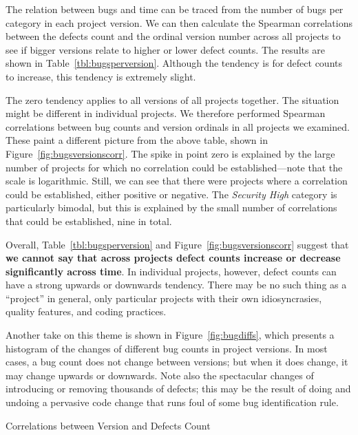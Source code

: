 \documentclass[letterpaper,twocolumn,10pt]{article}
\begin{document}
The relation between bugs and time can be traced from the number of
bugs per category in each project version. We can then calculate the
Spearman correlations between the defects count and the ordinal
version number across all projects to see if bigger versions relate to
higher or lower defect counts. The results are shown in
Table~\ref{tbl:bugsperversion}. Although the tendency is for defect
counts to increase, this tendency is extremely slight.

The zero tendency applies to all versions of all projects together. 
The situation might be different in individual projects. We therefore
performed Spearman correlations between bug counts and version
ordinals in all projects we examined. These paint a different picture
from the above table, shown in Figure~\ref{fig:bugsversionscorr}. The
spike in point zero is explained by the large number of projects for
which no correlation could be established---note that the scale is
logarithmic. Still, we can see that there were projects where a
correlation could be established, either positive or negative. The
{\it Security High} category is particularly bimodal, but this is
explained by the small number of correlations that could be
established, nine in total.

Overall, Table~\ref{tbl:bugsperversion} and
Figure~\ref{fig:bugsversionscorr} suggest that \textbf{we cannot say that
across projects defect counts increase or decrease significantly
across time}. In individual projects, however, defect counts can have a
strong upwards or downwards tendency. There may be no such thing as a
``project'' in general, only particular projects with their own
idiosyncrasies, quality features, and coding practices.

Another take on this theme is shown in Figure~\ref{fig:bugdiffs},
which presents a histogram of the changes of different bug counts in
project versions. In most cases, a bug count does not change between
versions; but when it does change, it may change upwards or downwards.
Note also the spectacular changes of introducing or removing thousands
of defects; this may be the result of doing and undoing a pervasive
code change that runs foul of some bug identification rule.

\begin{table}[tphp]
    \centering
    \caption{Correlations between Version and Defects Count}
    \label{tbl:bugsperversion}
    
\end{table}
\end{document}

